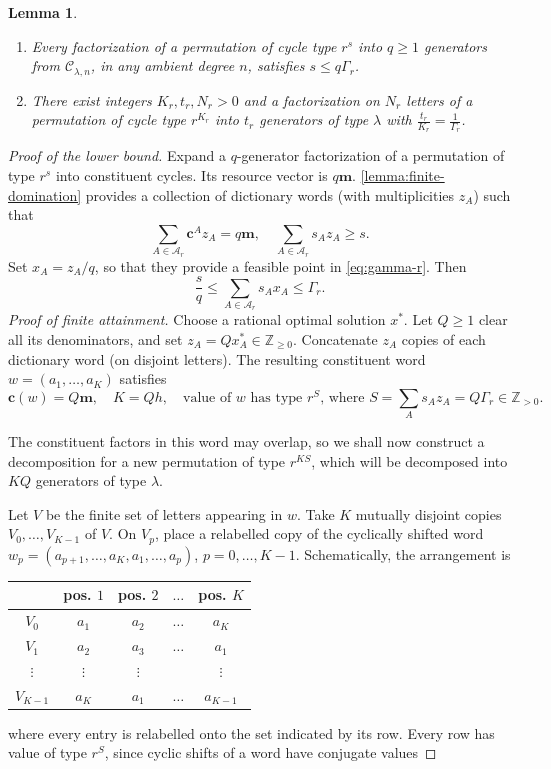 \documentclass[DIV=12,10pt]{scrartcl}
\newtheorem{lemma}{Lemma}
\theoremstyle{definition}
\newcommand{\cvec}{\mathbf{c}}
\newcommand{\mvec}{\mathbf{m}}
\newcommand{\dict}{\mathcal{A}}
\newcommand{\cc}{\mathcal{C}}
\begin{document}
\begin{lemma}\leavevmode
	\label{lemma:sharp-bound}
	\begin{enumerate}
		\item Every factorization of a permutation of cycle type $r^s$ into $q\geqslant 1$ generators from $\cc_{\lambda,n}$, in any ambient degree $n$, satisfies $s\leqslant q\Gamma_r$.
		\item There exist integers $K_r,t_r,N_r>0$ and a factorization on $N_r$ letters of a permutation of cycle type $r^{K_r}$ into $t_r$ generators of type $\lambda$ with $\frac{t_r}{K_r} = \frac{1}{\Gamma_r}$.
	\end{enumerate}
\end{lemma}
\begin{proof}[Proof of the lower bound]
Expand a $q$-generator factorization of a permutation of type $r^s$ into constituent cycles. Its resource vector is $q\mvec$. \cref{lemma:finite-domination} provides a collection of dictionary words (with multiplicities $z_A$) such that
\[
	\sum_{A\in\dict_r} \cvec^A z_A = q\mvec, \quad \sum_{A\in\dict_r} s_A z_A \geqslant s.
\]
Set $x_A = z_A/q$, so that they provide a feasible point in \cref{eq:gamma-r}. Then
\[
	\frac{s}{q} \leqslant \sum_{A\in\dict_r} s_A x_A \leqslant \Gamma_r.
\]
\emph{Proof of finite attainment.} Choose a rational optimal solution $x^*$. Let $Q\geqslant 1$ clear all its denominators, and set $z_A = Q x^*_A\in\mathbb{Z}_{\geqslant 0}$. Concatenate $z_A$ copies of each dictionary word (on disjoint letters). The resulting constituent word $w=(a_1,\ldots,a_K)$ satisfies
\[
	\cvec(w) = Q\mvec, \quad K=Qh, \quad \text{value of $w$ has type $r^S$, where $S=\sum_A s_A z_A = Q\Gamma_r \in\mathbb{Z}_{>0}$.}
\]

The constituent factors in this word may overlap, so we shall now construct a decomposition for a new permutation of type $r^{KS}$, which will be decomposed into $KQ$ generators of type $\lambda$.

Let $V$ be the finite set of letters appearing in $w$. Take $K$ mutually disjoint copies $V_0,\ldots,V_{K-1}$ of $V$. On $V_p$, place a relabelled copy of the cyclically shifted word $w_p = (a_{p+1},\ldots,a_K,a_1,\ldots,a_p)$, $p=0,\ldots,K-1$. Schematically, the arrangement is
\begin{center}
	\begin{tabular}{c|cccc}
		& pos. $1$ & pos. $2$ & $\ldots$ & pos. $K$ \\\hline
		$V_0$ & $a_1$ & $a_2$ & $\ldots$ & $a_K$ \\
		$V_1$ & $a_2$ & $a_3$ & $\ldots$ & $a_1$ \\
		$\vdots$ & $\vdots$ & $\vdots$ && $\vdots$ \\
		$V_{K-1}$ & $a_K$ & $a_1$ & $\ldots$ & $a_{K-1}$
	\end{tabular}
\end{center}
where every entry is relabelled onto the set indicated by its row. Every row has value of type $r^S$, since cyclic shifts of a word have conjugate values


\end{proof}
\end{document}
